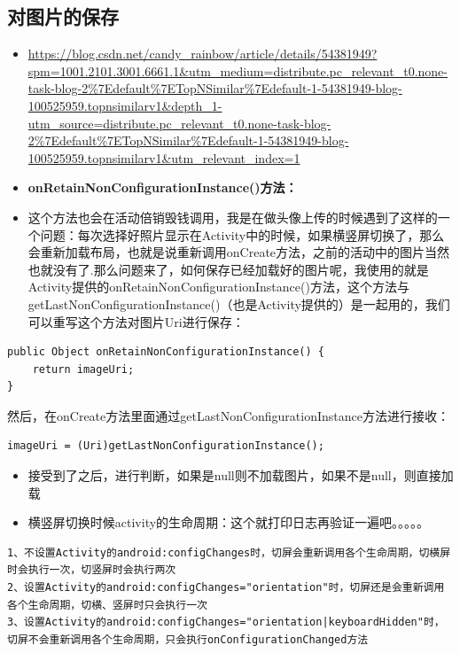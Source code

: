 \documentclass[9pt, b5paper]{article}
\begin{document}
\subsection{对图片的保存}
\label{sec-14-2}
\begin{itemize}
\item \url{https://blog.csdn.net/candy_rainbow/article/details/54381949?spm=1001.2101.3001.6661.1&utm_medium=distribute.pc_relevant_t0.none-task-blog-2\%7Edefault\%7ETopNSimilar\%7Edefault-1-54381949-blog-100525959.topnsimilarv1&depth_1-utm_source=distribute.pc_relevant_t0.none-task-blog-2\%7Edefault\%7ETopNSimilar\%7Edefault-1-54381949-blog-100525959.topnsimilarv1&utm_relevant_index=1}
\item \textbf{onRetainNonConfigurationInstance()方法：}
\item 这个方法也会在活动倍销毁钱调用，我是在做头像上传的时候遇到了这样的一个问题：每次选择好照片显示在Activity中的时候，如果横竖屏切换了，那么会重新加载布局，也就是说重新调用onCreate方法，之前的活动中的图片当然也就没有了.那么问题来了，如何保存已经加载好的图片呢，我使用的就是Activity提供的onRetainNonConfigurationInstance()方法，这个方法与getLastNonConfigurationInstance()（也是Activity提供的）是一起用的，我们可以重写这个方法对图片Uri进行保存：
\end{itemize}
\begin{verbatim}
public Object onRetainNonConfigurationInstance() {
    return imageUri;
}
\end{verbatim}
然后，在onCreate方法里面通过getLastNonConfigurationInstance方法进行接收：
\begin{verbatim}
imageUri = (Uri)getLastNonConfigurationInstance();
\end{verbatim}
\begin{itemize}
\item 接受到了之后，进行判断，如果是null则不加载图片，如果不是null，则直接加载
\item 横竖屏切换时候activity的生命周期：这个就打印日志再验证一遍吧。。。。。
\end{itemize}
\begin{verbatim}
1、不设置Activity的android:configChanges时，切屏会重新调用各个生命周期，切横屏时会执行一次，切竖屏时会执行两次 
2、设置Activity的android:configChanges="orientation"时，切屏还是会重新调用各个生命周期，切横、竖屏时只会执行一次 
3、设置Activity的android:configChanges="orientation|keyboardHidden"时，切屏不会重新调用各个生命周期，只会执行onConfigurationChanged方法
\end{verbatim}
\end{document}
